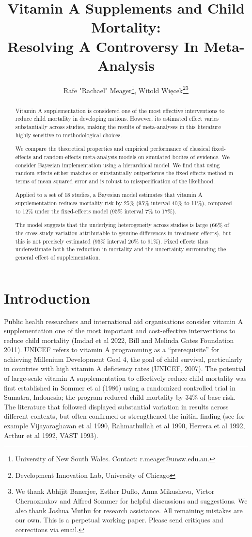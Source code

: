\documentclass[12pt]{article}
\title{\Large Vitamin A Supplements and Child Mortality:\\ Resolving A Controversy In Meta-Analysis\\
}
\author{Rafe "Rachael" Meager\footnote{University of New South Wales. Contact: r.meager@unsw.edu.au.}, \quad Witold Więcek\footnote{Development Innovation Lab, University of Chicago}\;\thanks{We thank Abhijit Banerjee, Esther Duflo, Anna Mikusheva, Victor Chernozhukov and Alfred Sommer for helpful discussions and suggestions. We also thank Joshua Muthu for research assistance. All remaining mistakes are our own. This is a perpetual working paper. Please send critiques and corrections via email.}}
\begin{document}
\maketitle

\begin{abstract}
Vitamin A supplementation is considered one of the most effective interventions to reduce child mortality in developing nations. However, its estimated effect varies substantially across studies, making the results of meta-analyses in this literature highly sensitive to methodological choices. 

We compare the theoretical properties and empirical performance of classical fixed-effects and  random-effects meta-analysis models on simulated bodies of evidence. We consider Bayesian implementation using a hierarchical model. We find that using random effects either matches or substantially outperforms the fixed effects method in terms of mean squared error and is robust to misspecification of the likelihood. 

Applied to a set of 18 studies, a Bayesian model estimates that vitamin A supplementation reduces mortality risk by 25\% (95\% interval 40\% to 11\%), compared to 12\% under the fixed-effects model (95\% interval 7\% to 17\%). 

The model suggests that the underlying heterogeneity across studies is large (66\% of the cross-study variation attributable to genuine differences in treatment effects), but this is not precisely estimated (95\% interval 26\% to 91\%).
Fixed effects thus underestimate both the reduction in mortality and the uncertainty surrounding the general effect of supplementation. 

\end{abstract}

\section{Introduction}

Public health researchers and international aid organisations consider vitamin A supplementation one of the most important and cost-effective interventions to reduce child mortality (Imdad et al 2022, Bill and Melinda Gates Foundation 2011). UNICEF refers to vitamin A programming as a ``prerequisite'' for achieving Millenium Development Goal 4, the goal of child survival, particularly in countries with high vitamin A deficiency rates (UNICEF, 2007).  The potential of large-scale vitamin A supplementation to effectively reduce child mortality was first established in Sommer et al (1986) using a randomized controlled trial in Sumatra, Indonesia; the program reduced child mortality by 34\% of base risk. The literature that followed displayed substantial variation in results across different contexts, but often confirmed or strengthened the initial finding (see for example Vijayaraghavan et al 1990, Rahmathullah et al 1990, Herrera et al 1992, Arthur et al 1992, VAST 1993). 
\end{document}
